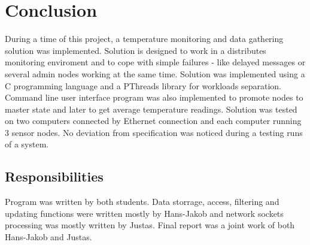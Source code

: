 \section{Conclusion}
\label{sec:conclusion}

During a time of this project, a temperature monitoring and data gathering solution was implemented. Solution is designed to work in a distributes monitoring enviroment and to cope with simple failures - like delayed messages or several admin nodes working at the same time. Solution was implemented using a C programming language and a PThreads library for workloads separation. Command line user interface program was also implemented to promote nodes to master state and later to get average temperature readings. Solution was tested on two computers connected by Ethernet connection and each computer running 3 sensor nodes. No deviation from specification was noticed during a testing runs of a system.

\subsection{Responsibilities}
\label{subsec:responsebilities}

Program was written by both students. Data storrage, access, filtering and updating functions were written mostly by Hans-Jakob and network sockets processing was mostly written by Justas. Final report was a joint work of both Hans-Jakob and Justas.
